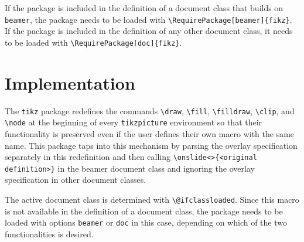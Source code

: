 \documentclass{article}
\begin{document}
If the package is included in the definition of a document class that builds on \verb|beamer|, the package needs to be loaded with \verb|\RequirePackage[beamer]{fikz}|. If the package is included in the definition of any other document class, it needs to be loaded with \verb|\RequirePackage[doc]{fikz}|.

\section{Implementation}

The \verb|tikz| package redefines the commands \verb|\draw|, \verb|\fill|, \verb|\filldraw|, \verb|\clip|, and \verb|\node| at the beginning of every \verb|tikzpicture| environment so that their functionality is preserved even if the user defines their own macro with the same name. This package taps into this mechanism by parsing the overlay specification separately in this redefinition and then calling \verb|\onslide<>{<original definition>}| in the beamer document class and ignoring the overlay specification in other document classes.

The active document class is determined with \verb|\@ifclassloaded|. Since this macro is not available in the definition of a document class, the package needs to be loaded with options \verb|beamer| or \verb|doc| in this case, depending on which of the two functionalities is desired.
\end{document}
